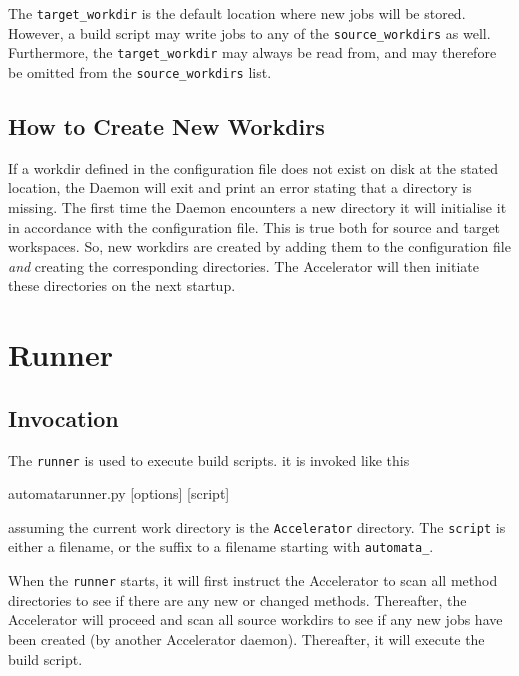 The \texttt{target\_workdir} is the default location where new jobs
will be stored.  However, a build script may write jobs to any of the
\texttt{source\_workdirs} as well.  Furthermore, the \texttt{target\_workdir}
may always be read from, and may therefore be omitted from
the \texttt{source\_workdirs} list.

\subsection{How to Create New Workdirs}
If a workdir defined in the configuration file does not exist on disk
at the stated location, the Daemon will exit and print an error
stating that a directory is missing.  The first time the Daemon
encounters a new directory it will initialise it in accordance with
the configuration file.  This is true both for source and target
workspaces.  So, new workdirs are created by adding them to the
configuration file \textsl{and} creating the corresponding
directories.  The Accelerator will then initiate these directories on
the next startup.







\clearpage
\section{Runner}

\subsection{Invocation}
The \texttt{runner} is used to execute build scripts.  it is invoked
like this
\begin{shell}
automatarunner.py [options] [script]
\end{shell}
assuming the current work directory is the \texttt{Accelerator}
directory.  The \texttt{script} is either a filename, or the suffix to
a filename starting with \texttt{automata\_}.


When the \texttt{runner} starts, it will first instruct the
Accelerator to scan all method directories to see if there are any new
or changed methods.  Thereafter, the Accelerator will proceed and scan
all source workdirs to see if any new jobs have been created (by
another Accelerator daemon).  Thereafter, it will execute the build
script.

